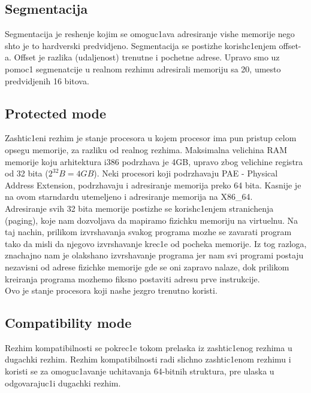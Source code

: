 \documentclass[a4paper,fleqn,12pt]{JMThesis}
\newcommand\eng{\fontencoding{OT1}\fontfamily{\rmdefault}\selectfont}
\begin{document}
\subsection{Segmentacija}
\smallskip

Segmentacija je reshenje kojim se omoguc1ava adresiranje vishe memorije nego
shto je to hardverski predvidjeno. Segmentacija se postizhe korish\/c1enjem
{\eng offset}-a. {\eng Offset} je razlika (udaljenost) trenutne i pochetne
adrese. Upravo smo uz pomoc1 segmenatcije u realnom rezhimu adresirali memoriju
sa 20, umesto predvidjenih 16 bitova.

\subsection{{\eng Protected mode}}
\smallskip

Zashtic1eni rezhim je stanje procesora u kojem procesor ima pun pristup celom
opsegu memorije, za razliku od realnog rezhima. Maksimalna velichina {\eng RAM}
memorije koju arhitektura {\eng i386} podrzhava je {\eng 4GB}, upravo zbog
velichine registra od 32 bita ($2^{32}B = 4GB$). Neki procesori koji
podrzhavaju {\eng PAE - Physical Address Extension}, podrzhavaju i adresiranje
memorija preko 64 bita. Kasnije je na ovom starndardu utemeljeno i adresiranje
memorija na {\eng X86\_64}.\\

Adresiranje svih 32 bita memorije postizhe se korish\/c1enjem stranichenja
({\eng paging}), koje nam dozvoljava da mapiramo fizichku memoriju na
virtuelnu. Na taj nachin, prilikom izvrshavanja svakog programa mozhe se
zavarati program tako da misli da njegovo izvrshavanje krec1e od pocheka
memorije. Iz tog razloga, znachajno nam je olakshano izvrshavanje programa jer
nam svi programi postaju nezavisni od adrese fizichke memorije gde se oni
zapravo nalaze, dok prilikom kreiranja programa mozhemo fiksno postaviti adresu
prve instrukcije.\\

Ovo je stanje procesora koji nashe jezgro trenutno koristi.

\subsection{{\eng Compatibility mode}}
\smallskip

Rezhim kompatibilnosti se pokrec1e tokom prelaska iz zashtic1enog rezhima u
dugachki rezhim. Rezhim kompatibilnosti radi slichno zashtic1enom rezhimu i
koristi se za omoguc1avanje uchitavanja 64-bitnih struktura, pre ulaska u
odgovarajuc1i dugachki rezhim.
\end{document}
